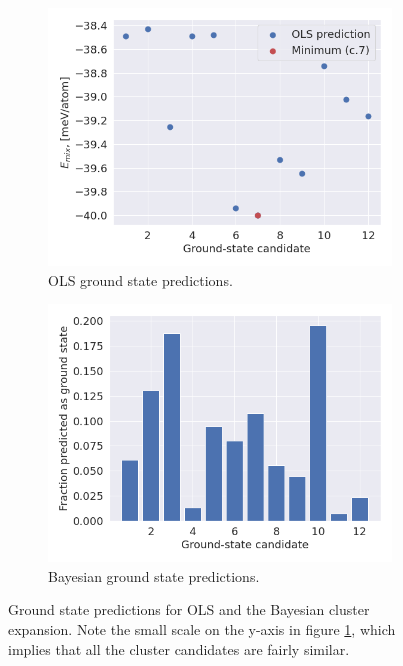 \documentclass[11pt,a4paper]{article}
\begin{document}
\begin{figure}[ht]
    \centering
    \begin{subfigure}{.5\textwidth}
          \centering
          \includegraphics[width=0.9\linewidth]{figures/OLS_prediction.png}
          \caption{OLS ground state predictions.}
          \label{fig:ols_ground}
    \end{subfigure}%
    \begin{subfigure}{.5\textwidth}
          \centering
          \includegraphics[width=0.9\linewidth]{figures/task4_bayes_hist.png}
          \caption{Bayesian ground state predictions.}
          \label{fig:bayes_ground}
    \end{subfigure}
    \caption{Ground state predictions for OLS and the Bayesian cluster expansion. Note the small scale on the y-axis in figure \ref{fig:ols_ground}, which implies that all the cluster candidates are fairly similar.}
    \label{fig:ground_predict}
\end{figure}
\end{document}
